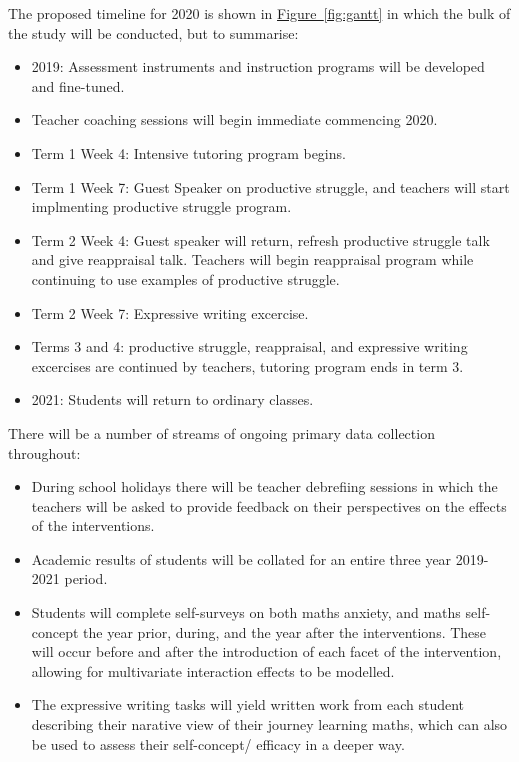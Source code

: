 \documentclass[14pt]{memoir}
\newcommand{\reffig}[1]{\hyperref[fig:#1]{Figure~\ref{fig:#1}}}
\begin{document}
The proposed timeline for 2020 is shown in \reffig{gantt} in which the bulk of the study will be conducted, but to summarise:
\begin{itemize}
	\item 2019: Assessment instruments and instruction programs will be developed and fine-tuned.
	\item Teacher coaching sessions will begin immediate commencing 2020.
	\item Term 1 Week 4: Intensive tutoring program begins.
	\item Term 1 Week 7: Guest Speaker on productive struggle, and teachers will start implmenting productive struggle program. 
	\item Term 2 Week 4: Guest speaker will return, refresh productive struggle talk and give reappraisal talk. Teachers will begin reappraisal program while continuing to use examples of productive struggle.
	\item Term 2 Week 7: Expressive writing excercise.
	\item Terms 3 and 4: productive struggle, reappraisal, and expressive writing excercises are continued by teachers, tutoring program ends in term 3.
	\item 2021: Students will return to ordinary classes.
\end{itemize}

There will be a number of streams of ongoing primary data collection throughout:
\begin{itemize}
 	\item  During school holidays there will be teacher debrefiing sessions in which the teachers will be asked to provide feedback on their perspectives on the effects of the interventions.
 	\item Academic results of students will be collated for an entire three year 2019-2021 period.
 	\item Students will complete self-surveys on both maths anxiety, and maths self-concept the year prior, during, and the year after the interventions. These will occur before and after the introduction of each facet of the intervention, allowing for multivariate interaction effects to be modelled.
 	\item The expressive writing tasks will yield written work from each student describing their narative view of their journey learning maths, which can also be used to assess their self-concept/ efficacy in a deeper way.
\end{itemize}
\end{document}
